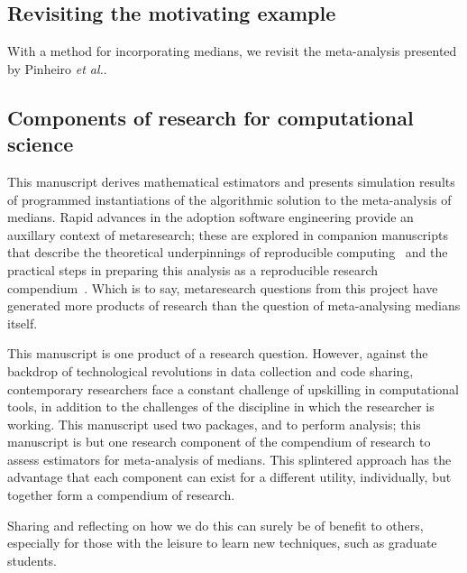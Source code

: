 \documentclass{article}
\begin{document}
\subsection{Revisiting the motivating example}
\label{sec: pin again}

With a method for incorporating medians, we revisit the meta-analysis presented by Pinheiro \emph{et al.}.




\subsection{Components of research for computational science}



This manuscript derives mathematical estimators and presents simulation results of programmed instantiations of the algorithmic solution to the meta-analysis of medians. Rapid advances in the adoption software engineering provide an auxillary context of metaresearch; these are explored in companion manuscripts that describe the theoretical underpinnings of reproducible computing~\cite{grayTruthProofReproducibility2019} and the practical steps in preparing this analysis as a reproducible research compendium~\cite{gray2019textttcodeproof}. Which is to say, metaresearch questions from this project have generated more products of research than the question of meta-analysing medians itself.

This manuscript is one product of a research question. However, against the backdrop of technological revolutions in data collection and code sharing, contemporary researchers face a constant challenge of upskilling in computational tools, in addition to the challenges of the discipline in which the researcher is working. This manuscript used two packages,  and  to perform analysis; this manuscript is but one research component of the compendium of research to assess estimators for meta-analysis of medians. This splintered approach has the advantage that each component can exist for a different utility, individually, but together form a compendium of research.

Sharing and reflecting on how we do this can surely be of benefit to others, especially for those with the leisure to learn new techniques, such as graduate students.


\medskip
\printbibliography
\end{document}
